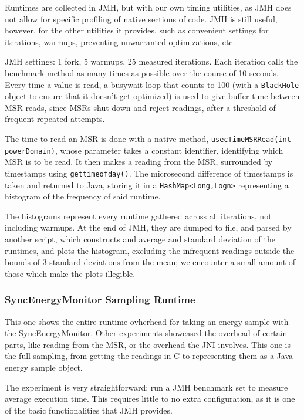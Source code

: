     Runtimes are collected in JMH, but with our own timing utilities, as JMH does not allow for specific profiling of native sections of code. JMH is still useful, however, for the other utilities it provides, such as convenient settings for iterations, warmups, preventing unwarranted optimizations, etc.
    
    JMH settings: 1 fork, 5 warmups, 25 measured iterations. Each iteration calls the benchmark method as many times as possible over the course of 10 seconds. Every time a value is read, a busywait loop that counts to 100 (with a \texttt{BlackHole} object to ensure that it doesn't get optimized) is used to give buffer time between MSR reads, since MSRs shut down and reject readings, after a threshold of frequent repeated attempts.
    
    The time to read an MSR is done with a native method, \texttt{usecTimeMSRRead(int powerDomain)}, whose parameter takes a constant identifier, identifying which MSR is to be read. It then makes a reading from the MSR, surrounded by timestamps using \texttt{gettimeofday()}. The microsecond difference of timestamps is taken and returned to Java, storing it in a \texttt{HashMap<Long,Logn>} representing a histogram of the frequency of said runtime.
    
    The histograms represent every runtime gathered across all iterations, not including warmups. At the end of JMH, they are dumped to file, and parsed by another script, which constructs and average and standard deviation of the runtimes, and plots the histogram, excluding the infrequent readings outside the bounds of 3 standard deviations from the mean; we encounter a small amount of those which make the plots illegible.

\subsubsection{SyncEnergyMonitor Sampling Runtime}
    This one shows the entire runtime ovherhead for taking an energy sample with the SyncEnergyMonitor. Other experiments showcased the overhead of certain parts, like reading from the MSR, or the overhead the JNI involves. This one is the full sampling, from getting the readings in C to representing them as a Java energy sample object.

    The experiment is very straightforward: run a JMH benchmark set to measure average execution time. This requires little to no extra configuration, as it is one of the basic functionalities that JMH provides.

